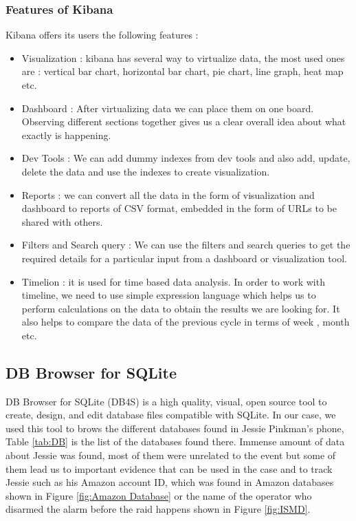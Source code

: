 \documentclass{easychair}
\begin{document}
\subsubsection{Features of Kibana}
Kibana offers its users the following features \cite{Mery_1}:

\begin{itemize}
\item Visualization : kibana has several way to virtualize data, the most used ones are : vertical bar chart, horizontal bar chart, pie chart, line graph, heat map etc.
\item Dashboard : After virtualizing data we can place them on one board. Observing different sections together gives us a clear overall idea about what exactly is happening.
\item Dev Tools : We can add dummy indexes from dev tools and also add, update, delete the data and use the indexes to create visualization.
\item Reports : we can convert all the data in the form of visualization and dashboard to reports of CSV format, embedded in the form of URLs to be shared with others.
\item Filters and Search query : We can use the filters and search queries to get the required details for a particular input from a dashboard or visualization tool.
\item Timelion : it is used for time based data analysis. In order to work with timeline, we need to use simple expression language which helps us to perform calculations on the data to obtain the results we are looking for. It also helps to compare the data of the previous cycle in terms of week , month etc.
\end{itemize}

\subsection{DB Browser for SQLite}
DB Browser for SQLite (DB4S) is a high quality, visual, open source tool to create, design, and edit database files compatible with SQLite. In our case, we used this tool to brows the different databases found in Jessie Pinkman's phone,  Table \ref{tab:DB} is the list of the databases found there. Immense amount of data about Jessie was found, most of them were unrelated to the event but some of them lead us to important evidence that can be used in the case and to track Jessie such as his Amazon account ID, which was found in Amazon databases shown in Figure \ref{fig:Amazon Database} or the name of the operator who disarmed the alarm before the raid happens shown in Figure \ref{fig:ISMD}.
\end{document}
